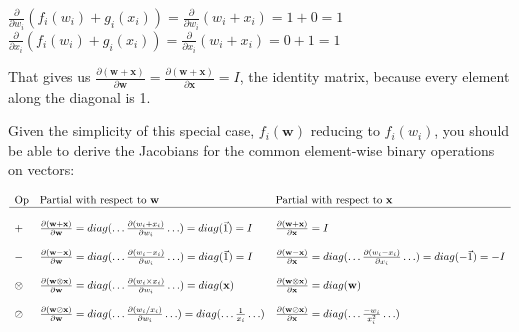 \documentclass[11pt]{article}
\begin{document}
$\frac{\partial}{\partial w_i} ( f_{i}(w_i) + g_{i}(x_i) ) = \frac{\partial}{\partial w_i}(w_i + x_i) = 1 + 0 = 1$\\
$\frac{\partial}{\partial x_i} ( f_{i}(w_i) + g_{i}(x_i) ) = \frac{\partial}{\partial x_i}(w_i + x_i) = 0 + 1 = 1$

That gives us $\frac{\partial (\mathbf{w+x})}{\partial \mathbf{w}} = \frac{\partial (\mathbf{w+x})}{\partial \mathbf{x}} = I$, the identity matrix, because every element along the diagonal is 1.

Given the simplicity of this special case, $f_i(\mathbf{w})$ reducing to $f_i(w_i)$, you should be able to derive the Jacobians for the common element-wise binary operations on vectors:

$
\begin{array}{lllll}
\text{Op} & \text{Partial with respect to } \mathbf{w} & \text{Partial with respect to }\mathbf{x}\\
\hline\\

+ & \frac{\partial (\mathbf{w+x})}{\partial \mathbf{w}} = diag(\ldots \frac{\partial (w_i + x_i)}{\partial w_i} \ldots) = diag(\vec{1}) = I & \frac{\partial (\mathbf{w+x})}{\partial \mathbf{x}} =  I\\\\

- & \frac{\partial (\mathbf{w-x})}{\partial \mathbf{w}}  =  diag(\ldots\frac{\partial (w_i - x_i)}{\partial w_i}\ldots) =  diag(\vec{1})  =  I & \frac{\partial (\mathbf{w-x})}{\partial \mathbf{x}}  =  diag(\ldots\frac{\partial (w_i - x_i)}{\partial x_i}\ldots)  =  diag(-\vec{1})  =  -I \\\\

\otimes & \frac{\partial (\mathbf{w \otimes x})}{\partial \mathbf{w}}  =  diag(\ldots\frac{\partial (w_i \times x_i)}{\partial w_i} \ldots)  =  diag(\mathbf{x}) & \frac{\partial (\mathbf{w \otimes x})}{\partial \mathbf{x}}  =  diag(\mathbf{w})\\\\

\oslash & \frac{\partial (\mathbf{w \oslash x})}{\partial \mathbf{w}}  =  diag(\ldots\frac{\partial (w_i / x_i)}{\partial w_i}\ldots)  =  diag(\ldots \frac{1}{x_i} \ldots) & \frac{\partial (\mathbf{w \oslash x})}{\partial \mathbf{x}}  =  diag(\ldots \frac{-w_i}{x_i^2} \ldots)\\

\end{array}
$
\end{document}
